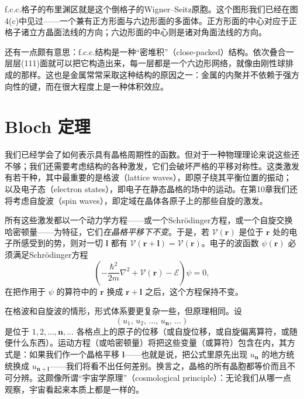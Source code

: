 f.c.c.格子的布里渊区就是这个倒格子的Wigner–Seitz原胞。这个图形我们已经在图 4(c)中见过——一个兼有正方形面与六边形面的多面体。正方形面的中心对应于正格子诸立方晶面法线的方向；六边形面的中心则是诸对角面法线的方向。

还有一点颇有意思：f.c.c.结构是一种“密堆积”（close-packed）结构。依次叠合一层层(111)面就可以把它构造出来，每一层都是一个六边形网络，就像由刚性球排成的那样。这也是金属常常采取这种结构的原因之一：金属的内聚并不依赖于强方向性的键，而在很大程度上是一种体积效应。

\section{Bloch 定理}

我们已经学会了如何表示具有晶格周期性的函数。但对于一种物理理论来说这些还不够；我们还需要考虑结构的各种激发，它们会破坏严格的平移对称性。这类激发有若干种，其中最重要的是格波（lattice waves），即原子绕其平衡位置的振动；以及电子态（electron states），即电子在静态晶格的场中的运动。在第10章我们还将考虑自旋波（spin waves），即定域在晶体各原子上的那些自旋的激发。

所有这些激发都以一个动力学方程——或一个Schrödinger方程，或一个自旋交换哈密顿量——为特征，它们\emph{在晶格平移下不变}。于是，若 $\mathcal{V}(\mathbf{r})$ 是位于 $\mathbf{r}$ 处的电子所感受到的势，则对一切 $\mathbf{l}$ 都有 $\mathcal{V}(\mathbf{r}+\mathbf{l})=\mathcal{V}(\mathbf{r})$。电子的波函数 $\psi(\mathbf{r})$ 必须满足Schrödinger方程
\begin{equation*}
\left(-\frac{\hbar^{2}}{2m}\nabla^{2}+\mathcal{V}(\mathbf{r})-\mathcal{E}\right)\psi=0,
\tag{1.37}
\end{equation*}
在把作用于 $\psi$ 的算符中的 $\mathbf{r}$ 换成 $\mathbf{r}+\mathbf{l}$ 之后，这个方程保持不变。

在格波和自旋波的情形，形式体系要更复杂一些，但原理相同。设
\begin{equation*}
(u_1,\,u_2,\,\dots,\,u_{\mathbf{n}},\,\dots)
\end{equation*}
是位于 $1,2,\dots,\mathbf{n},\dots$ 各格点上的原子的位移（或自旋位移，或自旋偏离算符，或随便什么东西）。运动方程（或哈密顿量）将把这些变量（或算符）包含在内，其方式是：如果我们作一个晶格平移 $\mathbf{l}$——也就是说，把公式里原先出现 $u_{\mathbf{n}}$ 的地方统统换成 $u_{\mathbf{n}+\mathbf{l}}$——我们将看不出任何差别。换言之，晶格的所有晶胞都等价而且不可分辨。这颇像所谓“宇宙学原理”（cosmological principle）：无论我们从哪一点观察，宇宙看起来本质上都是一样的。

